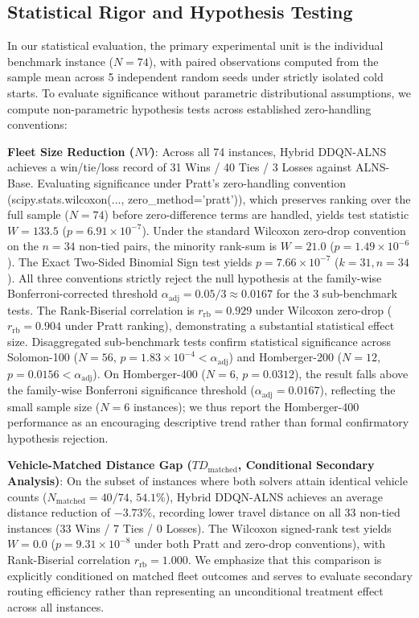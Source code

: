 \documentclass{ieeeaccess}
\begin{document}
\subsection{Statistical Rigor and Hypothesis Testing}
\label{sec:statistical_rigor}

In our statistical evaluation, the primary experimental unit is the individual benchmark instance ($N=74$), with paired observations computed from the sample mean across 5 independent random seeds under strictly isolated cold starts. To evaluate significance without parametric distributional assumptions, we compute non-parametric hypothesis tests across established zero-handling conventions:

\textbf{Fleet Size Reduction ($NV$)}: Across all 74 instances, Hybrid DDQN-ALNS achieves a win/tie/loss record of 31 Wins / 40 Ties / 3 Losses against ALNS-Base. Evaluating significance under Pratt's zero-handling convention (\textsf{\small scipy.stats.wilcoxon(..., zero\_method='pratt')}), which preserves ranking over the full sample ($N=74$) before zero-difference terms are handled, yields test statistic $W = 133.5$ ($p = 6.91 \times 10^{-7}$). Under the standard Wilcoxon zero-drop convention on the $n=34$ non-tied pairs, the minority rank-sum is $W = 21.0$ ($p = 1.49 \times 10^{-6}$). The Exact Two-Sided Binomial Sign test yields $p = 7.66 \times 10^{-7}$ ($k=31, n=34$). All three conventions strictly reject the null hypothesis at the family-wise Bonferroni-corrected threshold $\alpha_{\text{adj}} = 0.05 / 3 \approx 0.0167$ for the 3 sub-benchmark tests. The Rank-Biserial correlation is $r_{\text{rb}} = 0.929$ under Wilcoxon zero-drop ($r_{\text{rb}} = 0.904$ under Pratt ranking), demonstrating a substantial statistical effect size. Disaggregated sub-benchmark tests confirm statistical significance across Solomon-100 ($N=56$, $p = 1.83 \times 10^{-4} < \alpha_{\text{adj}}$) and Homberger-200 ($N=12$, $p = 0.0156 < \alpha_{\text{adj}}$). On Homberger-400 ($N=6$, $p = 0.0312$), the result falls above the family-wise Bonferroni significance threshold ($\alpha_{\text{adj}} = 0.0167$), reflecting the small sample size ($N=6$ instances); we thus report the Homberger-400 performance as an encouraging descriptive trend rather than formal confirmatory hypothesis rejection.

\textbf{Vehicle-Matched Distance Gap ($TD_{\text{matched}}$, Conditional Secondary Analysis)}: On the subset of instances where both solvers attain identical vehicle counts ($N_{\text{matched}} = 40 / 74$, $54.1\%$), Hybrid DDQN-ALNS achieves an average distance reduction of $-3.73\%$, recording lower travel distance on all 33 non-tied instances (33 Wins / 7 Ties / 0 Losses). The Wilcoxon signed-rank test yields $W = 0.0$ ($p = 9.31 \times 10^{-8}$ under both Pratt and zero-drop conventions), with Rank-Biserial correlation $r_{\text{rb}} = 1.000$. We emphasize that this comparison is explicitly conditioned on matched fleet outcomes and serves to evaluate secondary routing efficiency rather than representing an unconditional treatment effect across all instances.
\end{document}
